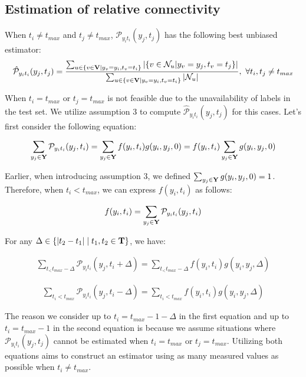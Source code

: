\subsection{Estimation of relative connectivity}
\label{apdx:rel_con}

When $t_i \neq t_{max}$ and $t_j \neq t_{max}$, $\mathcal{P}_{y_i t_i} (y_j ,t_j)$ has the following best unbiased estimator:
\begin{align}
\hat{\mathcal{P}}_{y_i t_i} (y_j ,t_j)={\sum_{u\in \{v\in \bold{V} | y_v=y_i, t_v=t_i\}}|\{v\in \mathcal{N}_u | y_v=y_j, t_v=t_j\}|\over \sum _{u\in \{v\in \bold{V} | y_v=y_i, t_v=t_i\}}|\mathcal{N}_u|} , \ \forall t_i, t_j \neq t_{max}
\end{align}


When $t_i=t_{max}$ or $t_j=t_{max}$ is not feasible due to the unavailability of labels in the test set. We utilize assumption 3 to compute $\hat{\mathcal{P}}_{y_i t_i} (y_j ,t_j)$ for this cases. Let's first consider the following equation:

\begin{align}
\sum_{y_j\in\bold Y}\mathcal{P}_{y_it_i}(y_j, t_i) = \sum_{y_j \in \bold{Y}} f(y_i, t_i)g(y_i, y_j, 0) =f(y_i, t_i)\sum_{y_j \in \bold{Y}}g(y_i, y_j, 0)
\end{align}

Earlier, when introducing assumption 3, we defined $\sum_{y_j \in \bold{Y}}g(y_i, y_j, 0)=1$. Therefore, when $t_i<t_{max}$, we can express $f(y_i, t_i)$ as follows:

\begin{align}
f(y_i, t_i)=\sum_{y_j\in\bold Y}\mathcal{P}_{y_it_i}(y_j, t_i)
\end{align}

For any $\Delta \in \{|t_2 -t_1 | \mid t_1, t_2\in \bold{T}\}$, we have:

\begin{align}
\sum_{t_< t_{max}-\Delta}\mathcal{P}_{y_it_i}(y_j, t_i+\Delta) =\sum_{t_< t_{max}-\Delta}f(y_i, t_i)g(y_i, y_j, \Delta)
\end{align}

\begin{align}
\sum_{t_i<t_{max}}\mathcal{P}_{y_it_i}(y_j, t_i-\Delta) =\sum_{t_i<t_{max}}f(y_i, t_i)g(y_i, y_j, \Delta)
\end{align}

The reason we consider up to $t_i= {t_{max}-1-\Delta}$ in the first equation and up to $t_i = t_{max}-1$ in the second equation is because we assume situations where ${\mathcal{P}}_{y_i t_i} (y_j ,t_j)$ cannot be estimated when $t_i=t_{max}$ or $t_j=t_{max}$. Utilizing both equations aims to construct an estimator using as many measured values as possible when $t_i\neq t_{max}$.

